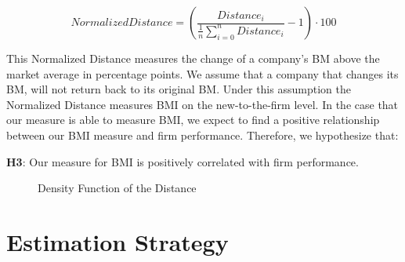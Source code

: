 \documentclass[
]{article}
\begin{document}
\[
{NormalizedDistance} = \left( \frac{{Distance}_i}{\frac{1}{n} \sum_{i=0}^{n} {Distance}_i} - 1 \right) \cdot 100
\]

This Normalized Distance measures the change of a company's BM above the
market average in percentage points. We assume that a company that
changes its BM, will not return back to its original BM. Under this
assumption the Normalized Distance measures BMI on the new-to-the-firm
level. In the case that our measure is able to measure BMI, we expect to
find a positive relationship between our BMI measure and firm
performance. Therefore, we hypothesize that:

\textbf{H3}: Our measure for BMI is positively correlated with firm
performance.

\begin{figure}


\caption{\label{fig-1}Density Function of the Distance}

\end{figure}%

\section{Estimation Strategy}\label{estimation-strategy}
\end{document}
